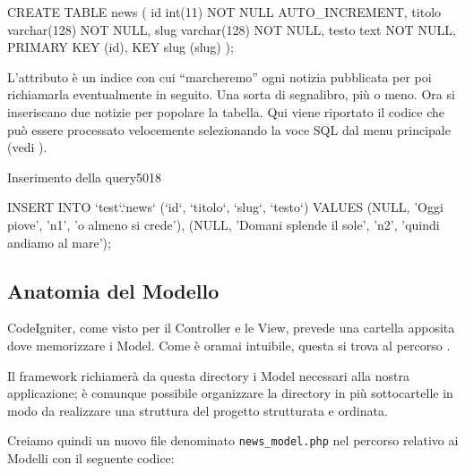 \begin{code}
CREATE TABLE news (
	id int(11) NOT NULL AUTO_INCREMENT,
	titolo varchar(128) NOT NULL,
	slug varchar(128) NOT NULL,
	testo text NOT NULL,
	PRIMARY KEY (id),
	KEY slug (slug)
);
\end{code}

L'attributo  è un indice con cui ``marcheremo'' ogni notizia pubblicata per poi richiamarla eventualmente in seguito. Una sorta di segnalibro, più o meno. Ora si inseriscano due notizie per popolare la tabella. Qui viene riportato il codice che può essere processato velocemente selezionando la voce SQL dal menu principale (vedi ).

\begin{img}{Inserimento della query}{5}{018}
\end{img}

\begin{code}
INSERT INTO `test`.`news` (`id`, `titolo`, `slug`, `testo`) 
VALUES (NULL, 'Oggi piove', 'n1', 'o almeno si crede'), 
	(NULL, 'Domani splende il sole', 'n2', 'quindi andiamo al mare');
\end{code}

\subsection{Anatomia del Modello}
CodeIgniter, come visto per il Controller e le View, prevede una cartella apposita dove memorizzare i Model. Come è oramai intuibile, questa si trova al percorso .

Il framework richiamerà da questa directory i Model necessari alla nostra applicazione; è comunque possibile organizzare la directory in più sottocartelle in modo da realizzare una struttura del progetto strutturata e ordinata.

Creiamo quindi un nuovo file denominato \verb|news_model.php| nel percorso relativo ai Modelli con il seguente codice:


